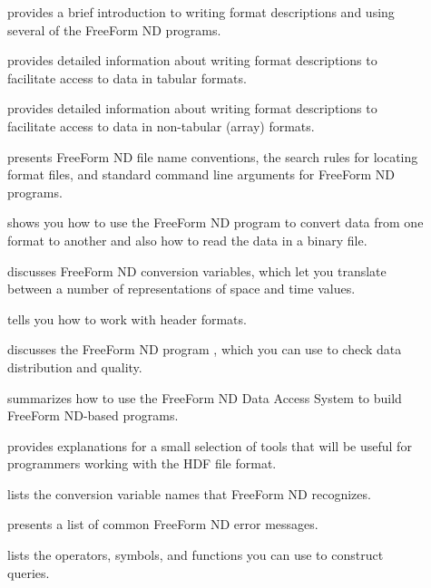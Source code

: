 \begin{description}
\item[] provides a brief
  introduction to writing format descriptions and using several of the
  FreeForm ND programs.
  
\item[] provides
  detailed information about writing format descriptions to facilitate
  access to data in tabular formats.
  
\item[] provides
  detailed information about writing format descriptions to facilitate
  access to data in non-tabular (array) formats.
  
\item[] presents FreeForm ND
  file name conventions, the search rules for locating format files,
  and standard command line arguments for FreeForm ND programs.
  
\item[] shows you how to use the
  FreeForm ND program  to convert data from one format to
  another and also how to read the data in a binary file.
  
\item[] discusses FreeForm ND
  conversion variables, which let you translate between a number of
  representations of space and time values.
  
\item[] tells you how to work with
  header formats.
  
\item[] discusses the FreeForm ND
  program , which you can use to check data distribution
  and quality.
  
\item[] summarizes
  how to use the FreeForm ND Data Access System to build FreeForm
  ND-based programs.

\item[] provides explanations for a small selection
  of tools that will be useful for programmers working with the HDF
  file format.
  
\item[] lists the conversion
  variable names that FreeForm ND recognizes.
  
\item[] presents a list of common
  FreeForm ND error messages.
  
\item[] lists the operators, symbols, and
  functions you can use to construct queries.
\end{description}

